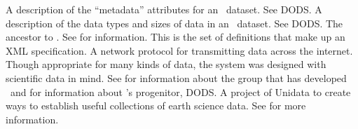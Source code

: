 \documentclass{dods-book}
\begin{document}
\begin{acronym}
   A description of the
  ``metadata'' attributes for an \opendap\ dataset.  See DODS.
   A description of the data
  types and sizes of data in an \opendap\ dataset.  See DODS.
   The ancestor to
  \opendap .  See
  for information.
   This is the set of definitions
  that make up an XML specification.
  A network protocol for transmitting data across the internet.
  Though appropriate for many kinds of data, the system was designed
  with scientific data in mind.  See
   for information about
  the group that has developed \opendap\ and
  for information about \opendap 's progenitor, DODS.
    A project of Unidata to create ways to establish useful
  collections of earth science data.  See
  for more information.
\end{acronym}

\printindex
\end{document}
